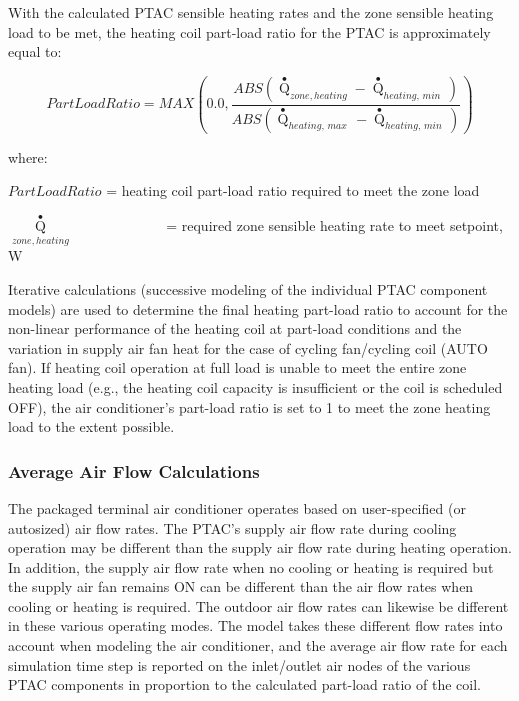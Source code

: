 With the calculated PTAC sensible heating rates and the zone sensible heating load to be met, the heating coil part-load ratio for the PTAC is approximately equal to:

\begin{equation}
PartLoadRatio = MAX\left( {0.0,\frac{{ABS\left( {{{\mathop Q\limits^ \bullet  }_{zone,heating}} - {{\mathop Q\limits^ \bullet  }_{heating,\,min\,}}} \right)}}{{ABS\left( {{{\mathop Q\limits^ \bullet  }_{heating,\,max\,}} - {{\mathop Q\limits^ \bullet  }_{heating,\,min\,}}} \right)}}} \right)
\end{equation}

where:

\(PartLoadRatio\) = heating coil part-load ratio required to meet the zone load

\({\mathop Q\limits^ \bullet_{zone,heating}}\) ~~~~~~~~~~~~ = required zone sensible heating rate to meet setpoint, W

Iterative calculations (successive modeling of the individual PTAC component models) are used to determine the final heating part-load ratio to account for the non-linear performance of the heating coil at part-load conditions and the variation in supply air fan heat for the case of cycling fan/cycling coil (AUTO fan). If heating coil operation at full load is unable to meet the entire zone heating load (e.g., the heating coil capacity is insufficient or the coil is scheduled OFF), the air conditioner's part-load ratio is set to 1 to meet the zone heating load to the extent possible.

\subsubsection{Average Air Flow Calculations}\label{average-air-flow-calculations-000}

The packaged terminal air conditioner operates based on user-specified (or autosized) air flow rates. The PTAC's supply air flow rate during cooling operation may be different than the supply air flow rate during heating operation. In addition, the supply air flow rate when no cooling or heating is required but the supply air fan remains ON can be different than the air flow rates when cooling or heating is required. The outdoor air flow rates can likewise be different in these various operating modes. The model takes these different flow rates into account when modeling the air conditioner, and the average air flow rate for each simulation time step is reported on the inlet/outlet air nodes of the various PTAC components in proportion to the calculated part-load ratio of the coil.

